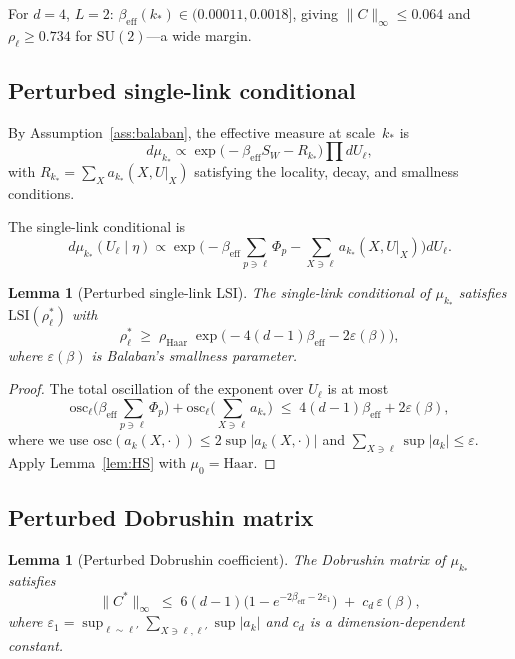 \documentclass[11pt]{article}
\newtheorem{lemma}[theorem]{Lemma}
\theoremstyle{definition}
\theoremstyle{remark}
\newcommand{\SU}{\mathrm{SU}}
\newcommand{\osc}{\mathrm{osc}}
\newcommand{\LSI}{\mathrm{LSI}}
\newcommand{\Haar}{\mathrm{Haar}}
\begin{document}
For $d = 4$, $L = 2$: 
$\beta_{\mathrm{eff}}(k_*) \in (0.00011, 0.0018]$, giving 
$\|C\|_\infty \leq 0.064$ and $\rho_\ell \geq 0.734$ for 
$\SU(2)$---a wide margin.

\subsection{Perturbed single-link conditional}

By Assumption~\ref{ass:balaban}, the effective measure at 
scale~$k_*$ is
\[
  d\mu_{k_*} \propto 
  \exp\!\bigl(-\beta_{\mathrm{eff}} S_W - R_{k_*}\bigr) 
  \prod dU_\ell,
\]
with $R_{k_*} = \sum_X a_{k_*}(X, U|_X)$ satisfying the locality, 
decay, and smallness conditions.

The single-link conditional is
\[
  d\mu_{k_*}(U_\ell \mid \eta) \propto 
  \exp\!\biggl(-\beta_{\mathrm{eff}} \sum_{p \ni \ell} \Phi_p 
  - \sum_{X \ni \ell} a_{k_*}(X, U|_X)\biggr) dU_\ell.
\]

\begin{lemma}[Perturbed single-link LSI]\label{lem:perturbed_link}
The single-link conditional of $\mu_{k_*}$ satisfies 
$\LSI(\rho_\ell^*)$ with
\[
  \rho_\ell^* \;\geq\; 
  \rho_{\Haar}\;\exp\!\bigl(-4(d-1)\beta_{\mathrm{eff}} 
  - 2\varepsilon(\beta)\bigr),
\]
where $\varepsilon(\beta)$ is Balaban's smallness parameter.
\end{lemma}

\begin{proof}
The total oscillation of the exponent over $U_\ell$ is at most
\[
  \osc_\ell\!\bigl(\beta_{\mathrm{eff}} {\textstyle\sum_{p\ni\ell}} 
  \Phi_p\bigr) + 
  \osc_\ell\!\bigl({\textstyle\sum_{X\ni\ell}} a_{k_*}\bigr) 
  \;\leq\; 4(d-1)\beta_{\mathrm{eff}} + 2\varepsilon(\beta),
\]
where we use $\osc(a_k(X,\cdot)) \leq 2\sup|a_k(X,\cdot)|$ and 
$\sum_{X\ni\ell}\sup|a_k| \leq \varepsilon$.  Apply 
Lemma~\ref{lem:HS} with $\mu_0 = \Haar$.
\end{proof}

\subsection{Perturbed Dobrushin matrix}

\begin{lemma}[Perturbed Dobrushin coefficient]\label{lem:perturbed_dob}
The Dobrushin matrix of $\mu_{k_*}$ satisfies
\begin{equation}\label{eq:perturbed_dob}
  \|C^*\|_\infty \;\leq\; 
  6(d-1)\bigl(1 - e^{-2\beta_{\mathrm{eff}} - 2\varepsilon_1}\bigr) 
  \;+\; c_d\,\varepsilon(\beta),
\end{equation}
where $\varepsilon_1 = \sup_{\ell\sim\ell'}\sum_{X\ni\ell,\ell'}\sup|a_k|$ 
and $c_d$ is a dimension-dependent constant.
\end{lemma}
\end{document}
